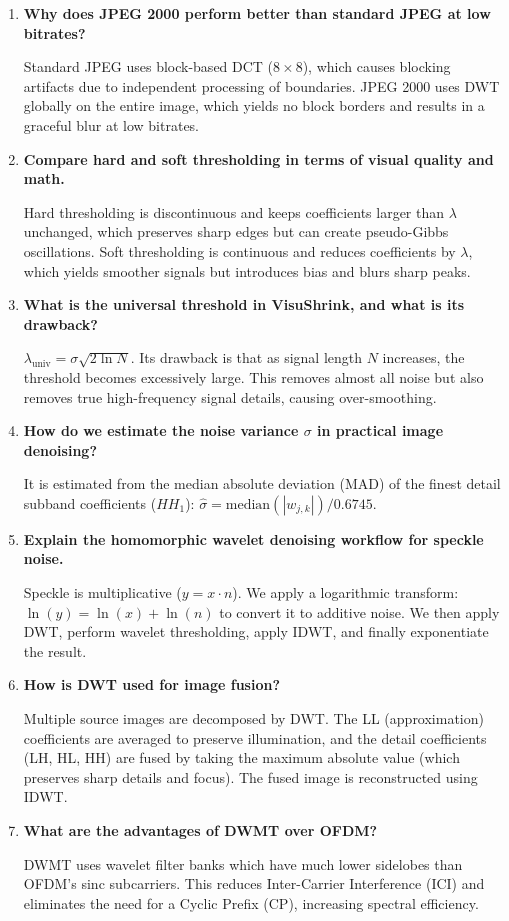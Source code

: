 \documentclass[12pt,a4paper]{article}
\newcommand{\Q}[1]{\textbf{#1}\par\noindent\ignorespaces}
\begin{document}
\begin{tcolorbox}[exambox, title={\textbf{Frequently Asked / Viva Questions}}]
\begin{enumerate}[topsep=0pt, label=\textbf{Q\arabic*.}, itemsep=5pt]
  \item \Q{Why does JPEG 2000 perform better than standard JPEG at low bitrates?}
        Standard JPEG uses block-based DCT ($8 \times 8$), which causes blocking artifacts due to independent processing of boundaries. JPEG 2000 uses DWT globally on the entire image, which yields no block borders and results in a graceful blur at low bitrates.

  \item \Q{Compare hard and soft thresholding in terms of visual quality and math.}
        Hard thresholding is discontinuous and keeps coefficients larger than $\lambda$ unchanged, which preserves sharp edges but can create pseudo-Gibbs oscillations. Soft thresholding is continuous and reduces coefficients by $\lambda$, which yields smoother signals but introduces bias and blurs sharp peaks.

  \item \Q{What is the universal threshold in VisuShrink, and what is its drawback?}
        $\lambda_{\text{univ}} = \sigma \sqrt{2 \ln N}$. Its drawback is that as signal length $N$ increases, the threshold becomes excessively large. This removes almost all noise but also removes true high-frequency signal details, causing over-smoothing.

  \item \Q{How do we estimate the noise variance $\sigma$ in practical image denoising?}
        It is estimated from the median absolute deviation (MAD) of the finest detail subband coefficients ($HH_1$): $\hat{\sigma} = \text{median}(|w_{j,k}|) / 0.6745$.

  \item \Q{Explain the homomorphic wavelet denoising workflow for speckle noise.}
        Speckle is multiplicative ($y = x \cdot n$). We apply a logarithmic transform: $\ln(y) = \ln(x) + \ln(n)$ to convert it to additive noise. We then apply DWT, perform wavelet thresholding, apply IDWT, and finally exponentiate the result.

  \item \Q{How is DWT used for image fusion?}
        Multiple source images are decomposed by DWT. The LL (approximation) coefficients are averaged to preserve illumination, and the detail coefficients (LH, HL, HH) are fused by taking the maximum absolute value (which preserves sharp details and focus). The fused image is reconstructed using IDWT.

  \item \Q{What are the advantages of DWMT over OFDM?}
        DWMT uses wavelet filter banks which have much lower sidelobes than OFDM's sinc subcarriers. This reduces Inter-Carrier Interference (ICI) and eliminates the need for a Cyclic Prefix (CP), increasing spectral efficiency.
\end{enumerate}
\end{tcolorbox}
\end{document}
